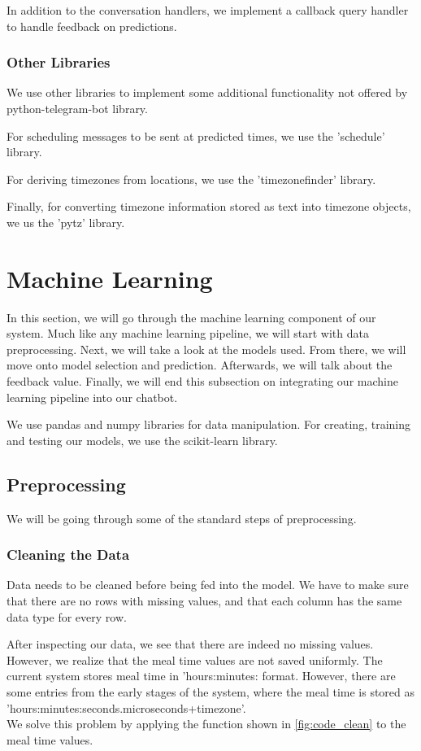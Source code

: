 In addition to the conversation handlers, we implement a callback query handler to handle feedback on predictions.

\subsubsection{Other Libraries}
We use other libraries to implement some additional functionality not offered by python-telegram-bot library.

For scheduling messages to be sent at predicted times, we use the 'schedule' library.

For deriving timezones from locations, we use the 'timezonefinder' library.

Finally, for converting timezone information stored as text into timezone objects, we us the 'pytz' library.

\section{Machine Learning}
In this section, we will go through the machine learning component of our system.
Much like any machine learning pipeline, we will start with data preprocessing.
Next, we will take a look at the models used.
From there, we will move onto model selection and prediction.
Afterwards, we will talk about the feedback value.
Finally, we will end this subsection on integrating our machine learning pipeline into our chatbot.

We use pandas \parencite{pandas} and numpy \parencite{numpy} libraries for data manipulation.
For creating, training and testing our models, we use the scikit-learn \parencite{scikit-learn} library.
\subsection{Preprocessing}
We will be going through some of the standard steps of preprocessing.
\subsubsection{Cleaning the Data}
Data needs to be cleaned before being fed into the model.
We have to make sure that there are no rows with missing values,
and that each column has the same data type for every row.

After inspecting our data, we see that there are indeed no missing values.
However, we realize that the meal time values are not saved uniformly.
The current system stores meal time in 'hours:minutes: format.
However, there are some entries from the early stages of the system, 
where the meal time is stored as\\
'hours:minutes:seconds.microseconds+timezone'.\\
We solve this problem by applying the function shown in \autoref{fig:code_clean} to the meal time values.


